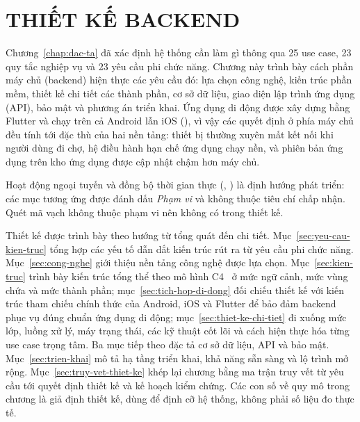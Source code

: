 \chapter{THIẾT KẾ BACKEND}\label{chap:backend}

Chương~\ref{chap:dac-ta} đã xác định hệ thống cần làm gì thông qua 25 use case, 23 quy tắc nghiệp vụ và 23 yêu cầu phi chức năng. Chương này trình bày cách phần máy chủ (backend) hiện thực các yêu cầu đó: lựa chọn công nghệ, kiến trúc phần mềm, thiết kế chi tiết các thành phần, cơ sở dữ liệu, giao diện lập trình ứng dụng (API), bảo mật và phương án triển khai. Ứng dụng di động được xây dựng bằng Flutter và chạy trên cả Android lẫn iOS (), vì vậy các quyết định ở phía máy chủ đều tính tới đặc thù của hai nền tảng: thiết bị thường xuyên mất kết nối khi người dùng đi chợ, hệ điều hành hạn chế ứng dụng chạy nền, và phiên bản ứng dụng trên kho ứng dụng được cập nhật chậm hơn máy chủ.

Hoạt động ngoại tuyến và đồng bộ thời gian thực (, ) là định hướng phát triển: các mục tương ứng được đánh dấu \emph{Phạm vi} và không thuộc tiêu chí chấp nhận. Quét mã vạch không thuộc phạm vi nên không có trong thiết kế.

Thiết kế được trình bày theo hướng từ tổng quát đến chi tiết. Mục~\ref{sec:yeu-cau-kien-truc} tổng hợp các yếu tố dẫn dắt kiến trúc rút ra từ yêu cầu phi chức năng. Mục~\ref{sec:cong-nghe} giới thiệu nền tảng công nghệ được lựa chọn. Mục~\ref{sec:kien-truc} trình bày kiến trúc tổng thể theo mô hình C4~\cite{c4model} ở mức ngữ cảnh, mức vùng chứa và mức thành phần; mục~\ref{sec:tich-hop-di-dong} đối chiếu thiết kế với kiến trúc tham chiếu chính thức của Android, iOS và Flutter để bảo đảm backend phục vụ đúng chuẩn ứng dụng di động; mục~\ref{sec:thiet-ke-chi-tiet} đi xuống mức lớp, luồng xử lý, máy trạng thái, các kỹ thuật cốt lõi và cách hiện thực hóa từng use case trọng tâm. Ba mục tiếp theo đặc tả cơ sở dữ liệu, API và bảo mật. Mục~\ref{sec:trien-khai} mô tả hạ tầng triển khai, khả năng sẵn sàng và lộ trình mở rộng. Mục~\ref{sec:truy-vet-thiet-ke} khép lại chương bằng ma trận truy vết từ yêu cầu tới quyết định thiết kế và kế hoạch kiểm chứng. Các con số về quy mô trong chương là giả định thiết kế, dùng để định cỡ hệ thống, không phải số liệu đo thực tế.

\begingroup
\usetalldiagrams












\endgroup

